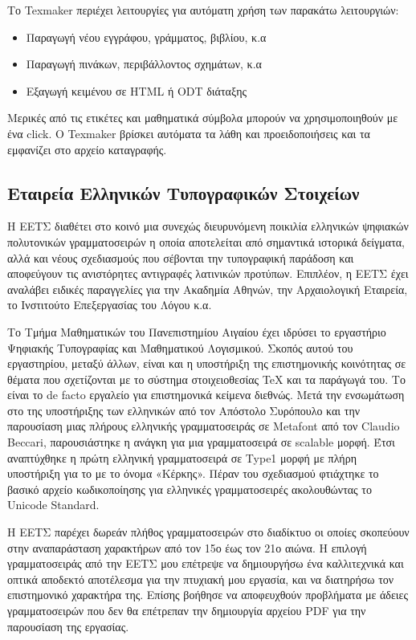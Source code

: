 Το Texmaker περιέχει λειτουργίες για αυτόματη χρήση των παρακάτω λειτουργιών:
\begin{itemize}
\item Παραγωγή νέου εγγράφου, γράμματος, βιβλίου, κ.α
\item Παραγωγή πινάκων, περιβάλλοντος σχημάτων, κ.α
\item Εξαγωγή κειμένου σε HTML ή ODT διάταξης
\end{itemize} 

Μερικές από τις ετικέτες  και μαθηματικά σύμβολα μπορούν να χρησιμοποιηθούν με ένα click. Ο Texmaker βρίσκει αυτόματα τα λάθη και προειδοποιήσεις και τα εμφανίζει στο αρχείο καταγραφής.

\subsection{Εταιρεία Ελληνικών Τυπογραφικών Στοιχείων}
H EETΣ διαθέτει στο κοινό μια συνεχώς διευρυνόμενη ποικιλία ελληνικών ψηφιακών πολυτονικών γραμματοσειρών η οποία αποτελείται από σημαντικά ιστορικά δείγματα, αλλά και νέους σχεδιασμούς που σέβονται την τυπογραφική παράδοση και αποφεύγουν τις ανιστόρητες αντιγραφές λατινικών προτύπων. Eπιπλέον, η EETΣ έχει αναλάβει ειδικές παραγγελίες για την Aκαδημία Aθηνών, την Aρχαιολογική Eταιρεία, το Iνστιτούτο Eπεξεργασίας του Λόγου κ.α.

Το Τμήμα Μαθηματικών του Πανεπιστημίου Αιγαίου έχει ιδρύσει το εργαστήριο Ψηφιακής Τυπογραφίας και Μαθηματικού Λογισμικού. Σκοπός αυτού του εργαστηρίου, μεταξύ άλλων, είναι και η υποστήριξη της επιστημονικής κοινότητας σε θέματα που σχετίζονται με το σύστημα στοιχειοθεσίας TeX και τα παράγωγά του. Το  είναι το de facto εργαλείο για επιστημονικά κείμενα διεθνώς. Μετά την ενσωμάτωση στο  της υποστήριξης των ελληνικών από τον Απόστολο Συρόπουλο και την παρουσίαση μιας πλήρους ελληνικής γραμματοσειράς σε Metafont από τον Claudio Beccari, παρουσιάστηκε η ανάγκη για μια γραμματοσειρά σε scalable μορφή. Έτσι αναπτύχθηκε η πρώτη ελληνική γραμματοσειρά σε Type1 μορφή με πλήρη υποστήριξη για το  με το όνομα «Κέρκης». Πέραν του σχεδιασμού φτιάχτηκε το βασικό αρχείο κωδικοποίησης για ελληνικές γραμματοσειρές ακολουθώντας  το Unicode Standard.

Η ΕΕΤΣ παρέχει δωρεάν πλήθος γραμματοσειρών στο διαδίκτυο οι οποίες σκοπεύουν στην αναπαράσταση χαρακτήρων από τον 15ο έως τον 21ο αιώνα. Η επιλογή γραμματοσειράς από την ΕΕΤΣ μου επέτρεψε να δημιουργήσω ένα καλλιτεχνικά και οπτικά αποδεκτό αποτέλεσμα για την πτυχιακή μου εργασία, και να διατηρήσω τον επιστημονικό χαρακτήρα της. Επίσης βοήθησε να αποφευχθούν προβλήματα με άδειες γραμματοσειρών που δεν θα επέτρεπαν την δημιουργία αρχείου PDF για την παρουσίαση της εργασίας.

